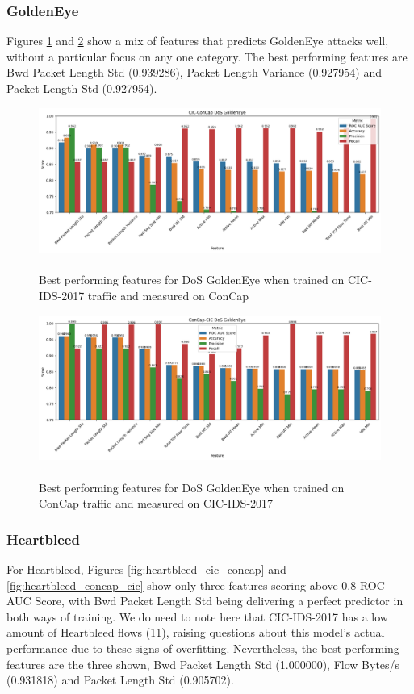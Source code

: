 \subsubsection{GoldenEye}
Figures \ref{fig:goldeneye_cic_concap} and \ref{fig:goldeneye_concap_cic} show a mix of features that predicts GoldenEye attacks well, without a particular focus on any one category. The best performing features are Bwd Packet Length Std (0.939286), Packet Length Variance (0.927954) and Packet Length Std (0.927954). 
\begin{figure}
	\centering
	\includegraphics[width=1.2\linewidth]{images/goldeneye_cic_concap}
	\caption{\\Best performing features for DoS GoldenEye when trained on CIC-IDS-2017 traffic and measured on ConCap}
	\label{fig:goldeneye_cic_concap}
\end{figure}
\begin{figure}
	\centering
	\includegraphics[width=1.2\linewidth]{images/goldeneye_concap_cic}
	\caption{\\Best performing features for DoS GoldenEye when trained on ConCap traffic and measured on CIC-IDS-2017}
	\label{fig:goldeneye_concap_cic}
\end{figure}

\subsubsection{Heartbleed}
For Heartbleed, Figures \ref{fig:heartbleed_cic_concap} and \ref{fig:heartbleed_concap_cic} show only three features scoring above 0.8 ROC AUC Score, with Bwd Packet Length Std being delivering a perfect predictor in both ways of training. We do need to note here that CIC-IDS-2017 has a low amount of Heartbleed flows (11), raising questions about this model's actual performance due to these signs of overfitting. Nevertheless, the best performing features are the three shown, Bwd Packet Length Std (1.000000), Flow Bytes/s (0.931818) and Packet Length Std (0.905702). 

